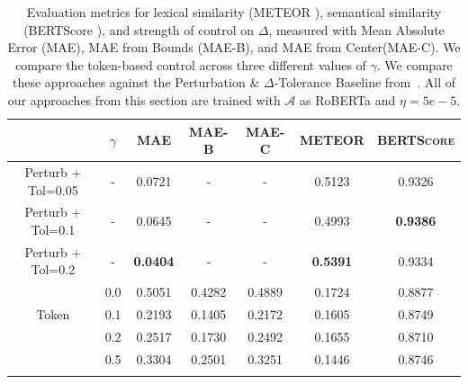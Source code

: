 \begin{table}[]
\centering
\small
\caption{Evaluation metrics for lexical similarity (METEOR \citep{lavie-agarwal-2007-meteor}), semantical similarity (BERTScore \citep{zhang2019bertscore}), and strength of control on $\Delta$, measured with Mean Absolute Error (MAE), MAE from Bounds (MAE-B), and MAE from Center(MAE-C). We compare the token-based control across three different values of $\gamma$. We compare these approaches against the Perturbation \& $\Delta$-Tolerance Baseline from~. All of our approaches from this section are trained with $\mathcal{A}$ as RoBERTa and $\eta=5e-5$.}
\label{tab:ac_gamma_variation}

\begin{tabularx}{\linewidth}{@{\extracolsep{\fill}} ccccccc}
\toprule[1.5pt]
                              & $\gamma$           & \textsc{MAE}    & \textsc{MAE-B} & \textsc{MAE-C} & \textsc{METEOR} & \textsc{BERTScore} \\
\midrule[0.75pt]
Perturb + Tol=0.05            & -                & 0.0721          & -              & -              & 0.5123          & 0.9326 \\
Perturb + Tol=0.1             & -                & 0.0645          & -              & -              & 0.4993          & \textbf{0.9386} \\
Perturb + Tol=0.2             & -                & \textbf{0.0404} & -              & -              & \textbf{0.5391} & 0.9334 \\
\midrule[0.75pt]
                              & 0.0              & 0.5051          & 0.4282         & 0.4889         & 0.1724          & 0.8877  \\
\multicolumn{1}{c}{Token}     & 0.1              & 0.2193          & 0.1405         & 0.2172         & 0.1605          & 0.8749  \\
                              & 0.2              & 0.2517          & 0.1730         & 0.2492         & 0.1655          & 0.8710  \\
                              & 0.5              & 0.3304          & 0.2501         & 0.3251         & 0.1446          & 0.8746  \\
  \bottomrule[1.5pt]\\
\end{tabularx}
\end{table}

